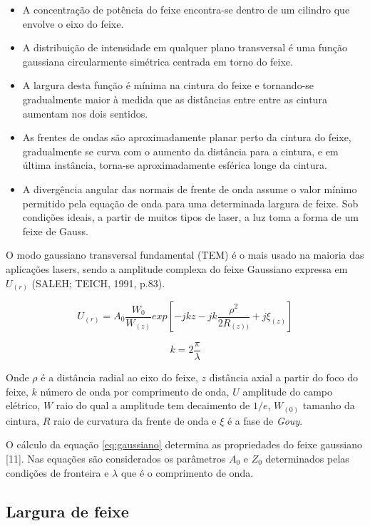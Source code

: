 \begin{itemize}
	\item A concentração de potência do feixe encontra-se dentro de um cilindro que envolve o eixo do feixe.
	\item A distribuição de intensidade em qualquer plano transversal é uma função gaussiana circularmente simétrica centrada em torno do feixe.
	\item A largura desta função é mínima na cintura do feixe e tornando-se gradualmente maior à medida que as distâncias entre entre as cintura aumentam nos dois sentidos.
	\item As frentes de ondas são aproximadamente planar perto da cintura do feixe, gradualmente se curva com o aumento da distância para a cintura, e em última instância, torna-se aproximadamente esférica longe da cintura.
	\item A divergência angular das normais de frente de onda assume o valor mínimo permitido pela equação de onda para uma determinada largura de feixe. Sob condições ideais, a partir de muitos tipos de laser, a luz toma a forma de um feixe de Gauss.
\end{itemize}

O modo gaussiano transversal fundamental (TEM) é o mais usado na maioria das aplicações lasers, sendo a amplitude complexa do feixe Gaussiano expressa em $U_{(r)}$ (SALEH; TEICH, 1991, p.83).

\begin{equation}
\label{eq:gaussiano}
U_{(r)}=A_0\frac{W_0}{W_{(z)}}exp\left [ -jkz-jk\frac{\rho ^2}{2R_{(z))}}+j\xi_{(z)} \right ]
\end{equation}

\begin{equation}
\label{eq:k_gaussiano}
k=2\frac{\pi}{\lambda}
\end{equation}

Onde $\rho$ é a distância radial ao eixo do feixe, $z$ distância axial a partir do foco do feixe, $k$ número de onda por comprimento de onda, $U$ amplitude do campo elétrico, $W$ raio do qual a amplitude tem decaimento de $1/e$, $W_{(0)}$ tamanho da cintura, $R$ raio de curvatura da frente de onda e $\xi$ é a fase de \emph{Gouy}.

O cálculo da equação \eqref{eq:gaussiano} determina as propriedades do feixe gaussiano [11]. Nas equações são considerados os parâmetros $A_0$ e $Z_0$ determinados pelas condições de fronteira e $\lambda$ que é o comprimento de onda.

\subsection{Largura de feixe}

